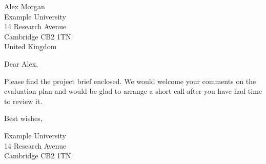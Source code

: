 \documentclass[12pt]{letter}
\date{29 August 2026}
\begin{document}
\begin{letter}{
  Alex Morgan\\
  Example University\\
  14 Research Avenue\\
  Cambridge CB2 1TN\\
  United Kingdom
}
\opening{Dear Alex,}

Please find the project brief enclosed. We would welcome your comments on the
evaluation plan and would be glad to arrange a short call after you have had
time to review it.

\closing{Best wishes,}
\end{letter}

\startlabels
{}
        {Example University\\14 Research Avenue\\Cambridge CB2 1TN}
\end{document}
